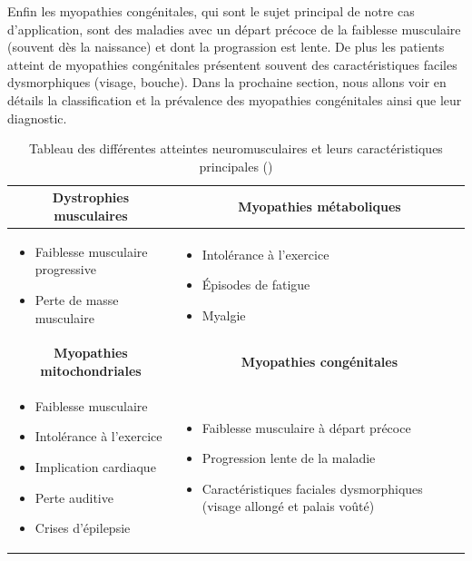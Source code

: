 Enfin les myopathies congénitales, qui sont le sujet principal de notre cas d'application, sont des maladies avec un départ précoce de la faiblesse musculaire (souvent dès la naissance) et dont la prograssion est lente. De plus les patients atteint de myopathies congénitales présentent souvent des caractéristiques faciles dysmorphiques (visage, bouche). Dans la prochaine section, nous allons voir en détails la classification et la prévalence des myopathies congénitales ainsi que leur diagnostic.
\begin{table}[!ht]
\centering
\begin{tabularx}{\textwidth}{|X|X|}
 \hline
\multicolumn{1}{|c|}{\textbf{Dystrophies musculaires}} & \multicolumn{1}{|c|}{\textbf{Myopathies métaboliques}} \\
\hline
\begin{itemize}
\item Faiblesse musculaire progressive
\item Perte de masse musculaire
\end{itemize} &
\begin{itemize}
\item Intolérance à l'exercice
\item Épisodes de fatigue
\item Myalgie
\end{itemize} \\
\hline

\multicolumn{1}{|c|}{\textbf{Myopathies mitochondriales}} & \multicolumn{1}{|c|}{\textbf{Myopathies congénitales}} \\
\hline
\begin{itemize}
\item Faiblesse musculaire
\item Intolérance à l'exercice
\item Implication cardiaque
\item Perte auditive
\item Crises d'épilepsie
\end{itemize} &
\begin{itemize}
\item Faiblesse musculaire à départ précoce
\item Progression lente de la maladie
\item Caractéristiques faciales dysmorphiques (visage allongé et palais voûté)
\end{itemize} \\
\hline
\end{tabularx}

\caption{Tableau des différentes atteintes neuromusculaires et leurs caractéristiques principales (\cite{lornage_identification_2019})}
\label{table:nmd}
\end{table}

